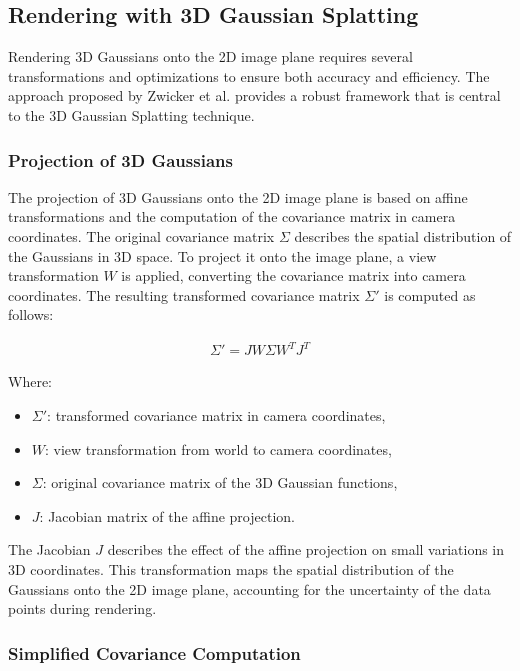 \subsection{Rendering with 3D Gaussian Splatting}

Rendering 3D Gaussians onto the 2D image plane requires several transformations and optimizations to ensure both accuracy and efficiency.
The approach proposed by Zwicker et al. \cite{zwicker2001ewa} provides a robust framework that is central to the 3D Gaussian Splatting technique.

\subsubsection{Projection of 3D Gaussians}

The projection of 3D Gaussians onto the 2D image plane is based on affine transformations and the computation of the covariance matrix in camera coordinates.
The original covariance matrix \(\Sigma\) describes the spatial distribution of the Gaussians in 3D space.
To project it onto the image plane, a view transformation \(W\) is applied, converting the covariance matrix into camera coordinates. The resulting transformed covariance matrix \(\Sigma'\) is computed as follows:

\begin{align}
\Sigma' = J W \Sigma W^T J^T
\end{align}

Where:
\begin{itemize}
    \item \(\Sigma'\): transformed covariance matrix in camera coordinates,
    \item \(W\): view transformation from world to camera coordinates,
    \item \(\Sigma\): original covariance matrix of the 3D Gaussian functions,
    \item \(J\): Jacobian matrix of the affine projection.
\end{itemize}

The Jacobian \(J\) describes the effect of the affine projection on small variations in 3D coordinates.
This transformation maps the spatial distribution of the Gaussians onto the 2D image plane, accounting for the uncertainty of the data points during rendering.

\subsubsection{Simplified Covariance Computation}

